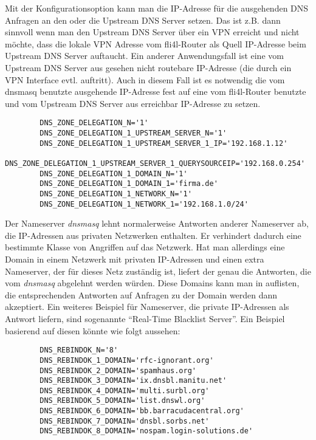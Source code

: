 \begin{description}
      Mit der
      Konfigurationsoption 
      kann man die IP-Adresse für die ausgehenden DNS Anfragen an den
      oder die Upstream DNS Server setzen. Das ist z.B. dann sinnvoll
      wenn man den Upstream DNS Server über ein VPN erreicht und nicht
      möchte, dass die lokale VPN Adresse vom fli4l-Router als Quell
      IP-Adresse beim Upstream DNS Server auftaucht. Ein anderer
      Anwendungsfall ist eine vom Upstream DNS Server aus gesehen
      nicht routebare IP-Adresse (die durch ein VPN Interface
      evtl. auftritt). Auch in diesem Fall ist es notwendig die vom
      dnsmasq benutzte ausgehende IP-Adresse fest auf eine vom
      fli4l-Router benutzte und vom Upstream DNS Server aus erreichbar
      IP-Adresse zu setzen.

\begin{example}
\begin{verbatim}
        DNS_ZONE_DELEGATION_N='1'
        DNS_ZONE_DELEGATION_1_UPSTREAM_SERVER_N='1'
        DNS_ZONE_DELEGATION_1_UPSTREAM_SERVER_1_IP='192.168.1.12'
        DNS_ZONE_DELEGATION_1_UPSTREAM_SERVER_1_QUERYSOURCEIP='192.168.0.254'
        DNS_ZONE_DELEGATION_1_DOMAIN_N='1'
        DNS_ZONE_DELEGATION_1_DOMAIN_1='firma.de'
        DNS_ZONE_DELEGATION_1_NETWORK_N='1'
        DNS_ZONE_DELEGATION_1_NETWORK_1='192.168.1.0/24'
\end{verbatim}
\end{example}


    Der Nameserver \emph{dnsmasq} lehnt normalerweise Antworten anderer
    Nameserver ab, die IP-Adressen aus privaten Netzwerken
    enthalten. Er verhindert dadurch eine bestimmte Klasse von
    Angriffen auf das Netzwerk. Hat man allerdings eine Domain in
    einem Netzwerk mit privaten IP-Adressen und einen extra
    Nameserver, der für dieses Netz zuständig ist, liefert der genau
    die Antworten, die vom \emph{dnsmasq} abgelehnt werden
    würden. Diese Domains kann man in 
    auflisten, die entsprechenden Antworten auf Anfragen zu der Domain
    werden dann akzeptiert.  Ein weiteres Beispiel für Nameserver, die
    private IP-Adressen als Antwort liefern, sind sogenannte
    ``Real-Time Blacklist Server''. Ein Beispiel basierend auf diesen
    könnte wie folgt aussehen:

\begin{example}
\begin{verbatim}
        DNS_REBINDOK_N='8'
        DNS_REBINDOK_1_DOMAIN='rfc-ignorant.org'
        DNS_REBINDOK_2_DOMAIN='spamhaus.org'
        DNS_REBINDOK_3_DOMAIN='ix.dnsbl.manitu.net'
        DNS_REBINDOK_4_DOMAIN='multi.surbl.org'
        DNS_REBINDOK_5_DOMAIN='list.dnswl.org'
        DNS_REBINDOK_6_DOMAIN='bb.barracudacentral.org'
        DNS_REBINDOK_7_DOMAIN='dnsbl.sorbs.net'
        DNS_REBINDOK_8_DOMAIN='nospam.login-solutions.de'
\end{verbatim}
\end{example}

\end{description}
